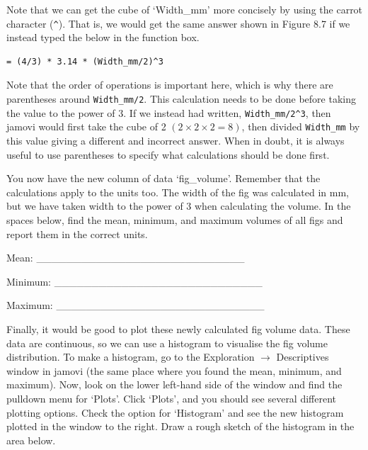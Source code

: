 \documentclass[
  openany]{scrbook}
\begin{document}
Note that we can get the cube of `Width\_mm' more concisely by using the carrot character (\texttt{\^{}}).
That is, we would get the same answer shown in Figure 8.7 if we instead typed the below in the function box.

\begin{verbatim}
= (4/3) * 3.14 * (Width_mm/2)^3
\end{verbatim}

Note that the order of operations is important here, which is why there are parentheses around \texttt{Width\_mm/2}. This calculation needs to be done before taking the value to the power of 3.
If we instead had written, \texttt{Width\_mm/2\^{}3}, then jamovi would first take the cube of 2 \((2 \times 2 \times 2 = 8)\), then divided \texttt{Width\_mm} by this value giving a different and incorrect answer.
When in doubt, it is always useful to use parentheses to specify what calculations should be done first.

You now have the new column of data `fig\_volume'.
Remember that the calculations apply to the units too.
The width of the fig was calculated in mm, but we have taken width to the power of 3 when calculating the volume.
In the spaces below, find the mean, minimum, and maximum volumes of all figs and report them in the correct units.

Mean: \_\_\_\_\_\_\_\_\_\_\_\_\_\_\_\_\_\_\_\_\_\_\_\_\_\_\_\_

Minimum: \_\_\_\_\_\_\_\_\_\_\_\_\_\_\_\_\_\_\_\_\_\_\_\_\_\_\_\_

Maximum: \_\_\_\_\_\_\_\_\_\_\_\_\_\_\_\_\_\_\_\_\_\_\_\_\_\_\_\_

Finally, it would be good to plot these newly calculated fig volume data.
These data are continuous, so we can use a histogram to visualise the fig volume distribution.
To make a histogram, go to the Exploration \(\to\) Descriptives window in jamovi (the same place where you found the mean, minimum, and maximum).
Now, look on the lower left-hand side of the window and find the pulldown menu for `Plots'.
Click `Plots', and you should see several different plotting options.
Check the option for `Histogram' and see the new histogram plotted in the window to the right.
Draw a rough sketch of the histogram in the area below.

\begin{verbatim}






\end{verbatim}
\end{document}

